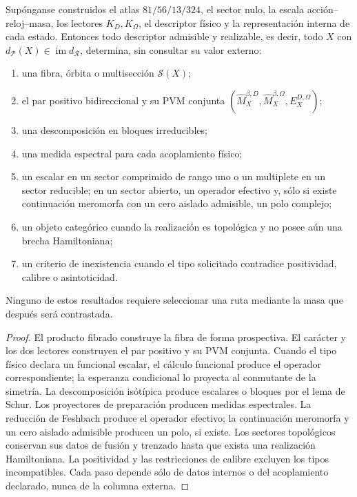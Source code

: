 \begin{theorem}
Supónganse construidos el atlas \(81/56/13/324\), el sector nulo, la escala
acción--reloj--masa, los lectores \(K_D,K_\Omega\), el descriptor físico y la
representación interna de cada estado. Entonces todo descriptor admisible y
realizable, es decir, todo \(X\) con
\(d_{\mathcal P}(X)\in\operatorname{im}d_{\mathcal R}\),
determina, sin consultar su valor externo:
\begin{enumerate}
\item una fibra, órbita o multisección \(\mathscr S(X)\);
\item el par positivo bidireccional y su PVM conjunta
      \((\widehat M_X^{\beta,D},\widehat M_X^{\beta,\Omega},
      E_X^{D,\Omega})\);
\item una descomposición en bloques irreducibles;
\item una medida espectral para cada acoplamiento físico;
\item un escalar en un sector comprimido de rango uno o un multiplete en un
      sector reducible; en un sector abierto, un operador efectivo y, sólo si
      existe continuación meromorfa con un cero aislado admisible, un polo
      complejo;
\item un objeto categórico cuando la realización es topológica y no posee aún
      una brecha Hamiltoniana;
\item un criterio de inexistencia cuando el tipo solicitado contradice
      positividad, calibre o asintoticidad.
\end{enumerate}
Ninguno de estos resultados requiere seleccionar una ruta mediante la masa
que después será contrastada.
\end{theorem}

\begin{proof}
El producto fibrado construye la fibra de forma prospectiva. El carácter y los
dos lectores construyen el par positivo y su PVM conjunta. Cuando el tipo
físico declara un funcional escalar, el cálculo funcional produce el operador
correspondiente; la esperanza condicional lo proyecta al conmutante de la
simetría. La descomposición isótípica produce escalares o bloques por el lema
de Schur. Los proyectores de preparación producen medidas espectrales. La
reducción de Feshbach produce el operador efectivo; la continuación meromorfa
y un cero aislado admisible producen un polo, si existe. Los sectores
topológicos conservan sus datos de fusión y trenzado hasta que exista una
realización Hamiltoniana. La positividad y las restricciones de calibre
excluyen los tipos incompatibles. Cada paso depende sólo de datos internos o
del acoplamiento declarado, nunca de la columna externa.
\end{proof}

